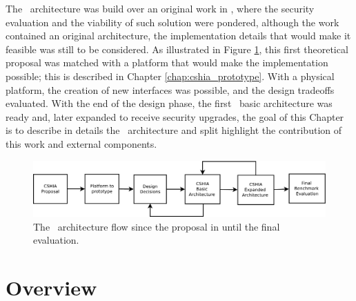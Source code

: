 

The \cshia~architecture was build over an original work in  \cite{Hoffman2015}, where the security evaluation and the viability of such solution were pondered, although the work contained an original architecture, the implementation details that would make it feasible was still to be considered.  As illustrated in Figure \ref{fig:cshiaflow}, this first theoretical proposal was matched with a platform that would make the implementation possible; this is described in Chapter \ref{chap:cshia_prototype}.  With a physical platform, the creation of new interfaces was possible, and the design tradeoffs evaluated. With the end of the design phase, the first \cshia~basic architecture was ready and, later expanded to receive security upgrades, the goal of this Chapter is to describe in details the \cshia~architecture and split highlight the contribution of this work and external components.
\begin{figure}[!ht]
    \centering
    \includegraphics[width=\textwidth]{figures/pdf/arch_flow.pdf}
    \caption{The \cshia~architecture flow since the proposal in \cite{Hoffman2015} until the final evaluation.}
    \label{fig:cshiaflow}
\end{figure}


\section{Overview}
\label{sec:overviewarch}


